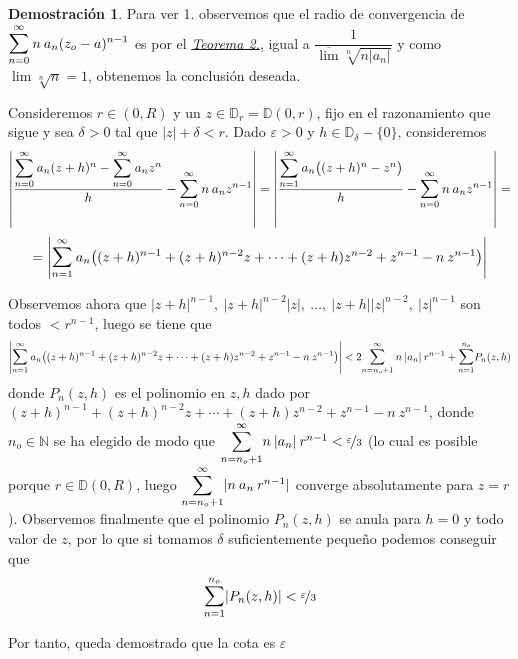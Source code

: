 \documentclass[12pt,twoside]{report}
\theoremstyle{azul}
\theoremstyle{azul2}
\theoremstyle{plain}
\theoremstyle{definition}
\newtheorem*{dem}{Demostración}
\theoremstyle{remark}
\begin{document}
\begin{dem} \: 

Para ver 1. observemos que el radio de convergencia de $\displaystyle \mathlarger{\sum}_{n=0}^{\infty} \:n \: a_n (z_o - a)^{n-1}$ es por el \hyperref[teo222]{\textit{Teorema 2.}}, igual a $\dfrac{1}{\overline{\lim} \sqrt[n]{n |a_n|}}$ y como $\lim \sqrt[n]{n} = 1$, obtenemos la conclusi{\'o}n deseada. 


Consideremos $r \in (0,R)$ y un $z \in \mathbb{D}_r=\mathbb{D}(0,r)$, fijo en el razonamiento que sigue y sea $\delta > 0$ tal que $|z|+\delta < r$. Dado $\varepsilon > 0$ y $h \in \mathbb{D}_{\delta}-\{0\}$, consideremos
$$\left| \dfrac{\mathlarger{\sum}_{n=0}^{\infty} \: a_n (z + h)^{n} - \mathlarger{\sum}_{n=0}^{\infty} \: a_n z^{n}}{h}  - \mathlarger{\sum}_{n=0}^{\infty} \:n \: a_n z^{n-1}\right| = \left| \dfrac{\mathlarger{\sum}_{n=1}^{\infty} \: a_n \big((z + h)^{n} - z^n\big)}{h} - \mathlarger{\sum}_{n=0}^{\infty} \:n \: a_n z^{n-1}\right| =  $$
$$ = \left|\mathlarger{\sum}_{n=1}^{\infty} \: a_n \big((z + h)^{n-1} + (z + h)^{n-2} z + \cdots + (z + h) z^{n-2} + z^{n-1} - n \: z^{n-1} \big) \right| $$

Observemos ahora que $|z+h|^{n-1}, \: |z+h|^{n-2}|z|, \: \ldots, \: |z+h| |z|^{n-2}, \: |z|^{n-1}$ son todos $< r^{n-1}$, luego se tiene que $$ \left|\mathlarger{\sum}_{n=1}^{\infty} \: a_n \big((z + h)^{n-1} + (z + h)^{n-2} z + \cdots + (z + h) z^{n-2} + z^{n-1} - n \: z^{n-1} \big) \right| < 2 \mathlarger{\sum}_{n=n_o+1}^{\infty} \: n \: |a_n| \: r^{n-1} + \mathlarger{\sum}_{n=1}^{n_o} P_n(z,h)$$ donde $P_n(z,h)$ es el polinomio en $z,h$ dado por $(z + h)^{n-1} + (z + h)^{n-2} z + \cdots + (z + h) z^{n-2} + z^{n-1} - n \: z^{n-1}$, donde $n_o \in \mathbb{N}$ se ha elegido de modo que $\mathlarger{\sum}_{n=n_o+1}^{\infty} n \:  |a_n| \: r^{n-1} < \nicefrac{\varepsilon}{3}$ (lo cual es posible porque $r \in \mathbb{D}(0, R)$, luego $\mathlarger{\sum}_{n=n_o+1}^{\infty} | n \: a_n \: r^{n-1} |$ converge absolutamente para $z=r$). Observemos finalmente que el polinomio $P_n(z,h)$ se anula para $h=0$ y todo valor de $z$, por lo que si tomamos $\delta$ suficientemente pequeño podemos conseguir que  
$$\mathlarger{\sum}_{n=1}^{n_o} | P_n(z,h)| < \nicefrac{\varepsilon}{3}$$

Por tanto, queda demostrado que la cota es $\varepsilon$


\end{dem}
\end{document}
